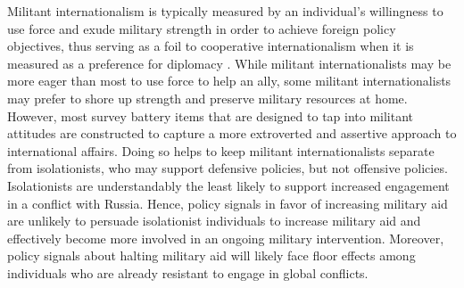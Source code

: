\begin{appendices}
Militant internationalism is typically measured by an individual's willingness to use force and exude military strength in order to achieve foreign policy objectives, thus serving as a foil to cooperative internationalism when it is measured as a preference for diplomacy \autocite{gravelle_structure_2017}. While militant internationalists may be more eager than most to use force to help an ally, some militant internationalists may prefer to shore up strength and preserve military resources at home. However, most survey battery items that are designed to tap into militant attitudes are constructed to capture a more extroverted and assertive approach to international affairs. Doing so helps to keep militant internationalists separate from isolationists, who may support defensive policies, but not offensive policies. Isolationists are understandably the least likely to support increased engagement in a conflict with Russia. Hence, policy signals in favor of increasing military aid are unlikely to persuade isolationist individuals to increase military aid and effectively become more involved in an ongoing military intervention. Moreover, policy signals about halting military aid will likely face floor effects among individuals who are already resistant to engage in global conflicts. 


\end{appendices}
